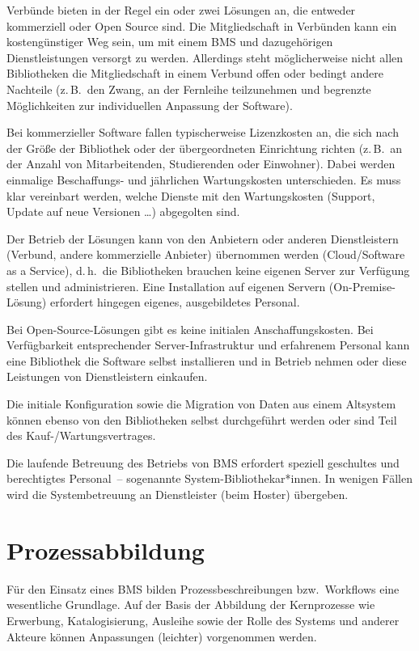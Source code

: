 \documentclass[
  11pt,
  letterpaper,
  DIV=11,
  twoside]{scrreprt}
\begin{document}
Verbünde bieten in der Regel ein oder zwei Lösungen an, die entweder
kommerziell oder Open Source sind. Die Mitgliedschaft in Verbünden kann
ein kostengünstiger Weg sein, um mit einem BMS und dazugehörigen
Dienstleistungen versorgt zu werden. Allerdings steht möglicherweise
nicht allen Bibliotheken die Mitgliedschaft in einem Verbund offen oder
bedingt andere Nachteile (z.\,B.~den Zwang, an der Fernleihe
teilzunehmen und begrenzte Möglichkeiten zur individuellen Anpassung der
Software).

Bei kommerzieller Software fallen typischerweise Lizenzkosten an, die
sich nach der Größe der Bibliothek oder der übergeordneten Einrichtung
richten (z.\,B.~an der Anzahl von Mitarbeitenden, Studierenden oder
Einwohner). Dabei werden einmalige Beschaffungs- und jährlichen
Wartungskosten unterschieden. Es muss klar vereinbart werden, welche
Dienste mit den Wartungskosten (Support, Update auf neue Versionen
\ldots) abgegolten sind.

Der Betrieb der Lösungen kann von den Anbietern oder anderen
Dienstleistern (Verbund, andere kommerzielle Anbieter) übernommen werden
(Cloud/Software as a Service), d.\,h.~die Bibliotheken brauchen keine
eigenen Server zur Verfügung stellen und administrieren. Eine
Installation auf eigenen Servern (On-Premise-Lösung) erfordert hingegen
eigenes, ausgebildetes Personal.

Bei Open-Source-Lösungen gibt es keine initialen Anschaffungskosten. Bei
Verfügbarkeit entsprechender Server-Infrastruktur und erfahrenem
Personal kann eine Bibliothek die Software selbst installieren und in
Betrieb nehmen oder diese Leistungen von Dienstleistern einkaufen.

Die initiale Konfiguration sowie die Migration von Daten aus einem
Altsystem können ebenso von den Bibliotheken selbst durchgeführt werden
oder sind Teil des Kauf-/Wartungsvertrages.

Die laufende Betreuung des Betriebs von BMS erfordert speziell
geschultes und berechtigtes Personal~-- sogenannte
System-Bibliothekar*innen. In wenigen Fällen wird die Systembetreuung an
Dienstleister (beim Hoster) übergeben.

\section{Prozessabbildung}\label{prozessabbildung}

Für den Einsatz eines BMS bilden Prozessbeschreibungen bzw.~Workflows
eine wesentliche Grundlage. Auf der Basis der Abbildung der Kernprozesse
wie Erwerbung, Katalogisierung, Ausleihe sowie der Rolle des Systems und
anderer Akteure können Anpassungen (leichter) vorgenommen werden.
\end{document}
